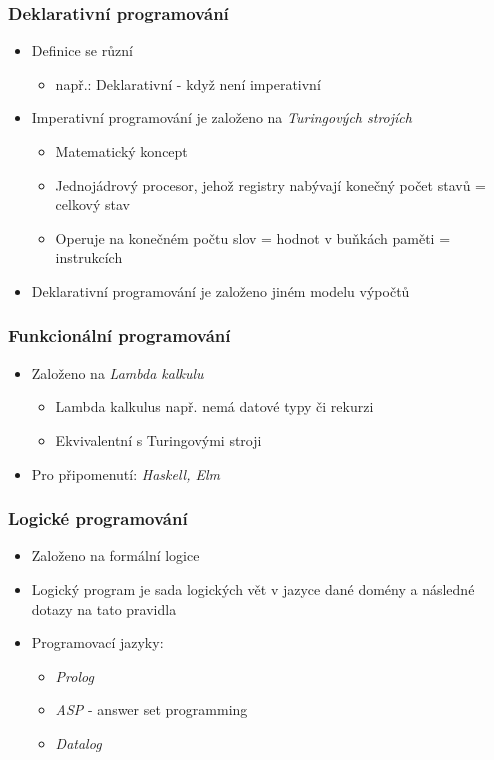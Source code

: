\begin{frame}
    \frametitle{Deklarativní programování}

    \begin{itemize}
        \item Definice se různí
        \begin{itemize}
            \item např.: Deklarativní - když není imperativní
        \end{itemize}
        \item Imperativní programování je založeno na \emph{Turingových strojích}
        \begin{itemize}
            \item Matematický koncept
            \item Jednojádrový procesor, jehož registry nabývají konečný počet stavů = celkový stav
            \item Operuje na konečném počtu slov = hodnot v buňkách paměti = instrukcích
        \end{itemize}
        \item Deklarativní programování je založeno jiném modelu výpočtů
    \end{itemize}
\end{frame}

\begin{frame}
    \frametitle{Funkcionální programování}

    \begin{itemize}
        \item Založeno na \emph{Lambda kalkulu}
        \begin{itemize}
            \item Lambda kalkulus např. nemá datové typy či rekurzi
            \item Ekvivalentní s Turingovými stroji
        \end{itemize}
        \item Pro připomenutí: \emph{Haskell, Elm}
    \end{itemize}
\end{frame}

\begin{frame}
    \frametitle{Logické programování}

    \begin{itemize}
        \item Založeno na formální logice
        \item Logický program je sada logických vět v jazyce dané domény a následné dotazy na tato pravidla
        \item Programovací jazyky:
        \begin{itemize}
            \item \emph{Prolog}
            \item \emph{ASP} - answer set programming
            \item \emph{Datalog}
        \end{itemize}
    \end{itemize}
\end{frame}
